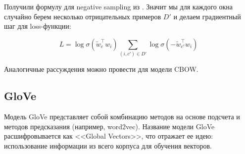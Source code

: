 Получили формулу для negative sampling из \cite{Mikolov:2}. Значит мы для каждого окна случайно берем несколько отрицательных примеров $D'$ и делаем градиентный шаг для loss-функции:

\begin{equation}
 L = \log\sigma(\tilde{w}_c^{\top} w_i) \sum_{(i,c')\in D'} \log\sigma(-\tilde{w}_{c'}^{\top} w_i)
\end{equation}

Аналогичные рассуждения можно провести для модели CBOW.


\subsection{GloVe}

Модель GloVe \cite{Pennington} представляет собой комбинацию методов на основе подсчета и методов предсказания (например, word2vec). Название модели GloVe расшифровывается как <<Global Vectors>>, что отражает ее идею: использование информации из всего корпуса для обучения векторов.






